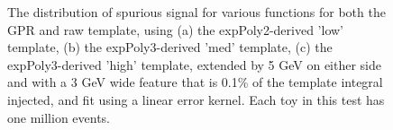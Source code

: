 \begin{figure} 
\begin{center}

\caption{The distribution of spurious signal for various functions for both the GPR and raw template, using (a) the expPoly2-derived 'low' template, (b) the expPoly3-derived 'med' template, (c) the expPoly3-derived 'high' template, extended by 5 GeV on either side and with a 3 GeV wide feature that is 0.1\% of the template integral injected, and fit using a linear error kernel. Each toy in this test has one million events.}
\label{fig:linearkernel_lowpt_1000_Siginj}
\end{center}
\end{figure}

